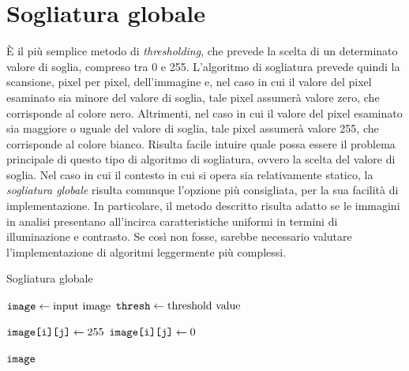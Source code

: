 \section{Sogliatura globale}
\label{sec:image-bin-global}
\`E il pi\`u semplice metodo di \textit{thresholding}, che prevede la scelta di un determinato valore di soglia, compreso tra 0 e 255. L'algoritmo di sogliatura prevede quindi la scansione, pixel per pixel, dell'immagine e, nel caso in cui il valore del pixel esaminato sia minore del valore di soglia, tale pixel assumer\`a valore zero, che corrisponde al colore nero. Altrimenti, nel caso in cui il valore del pixel esaminato sia maggiore o uguale del valore di soglia, tale pixel assumer\`a valore 255, che corrisponde al colore bianco. Risulta facile intuire quale possa essere il problema principale di questo tipo di algoritmo di sogliatura, ovvero la scelta del valore di soglia.
Nel caso in cui il contesto in cui si opera sia relativamente statico, la \textit{sogliatura globale} risulta comunque l'opzione pi\`u consigliata, per la sua facilit\`a di implementazione. In particolare, il metodo descritto risulta adatto se le immagini in analisi presentano all'incirca caratteristiche uniformi in termini di illuminazione e contrasto. Se cos\`i non fosse, sarebbe necessario valutare l'implementazione di algoritmi leggermente pi\`u complessi.
\begin{algorithm}
	\caption{Sogliatura globale}
	\label{alg:thresh-global}
	\begin{algorithmic}[1]
			\State $\texttt{image} \gets \text{input image}$
			\State $\texttt{thresh} \gets \text{threshold value}$
			
						\State $\texttt{image[i][j]} \gets 255$
					\Else
						\State $\texttt{image[i][j]} \gets 0$
					\EndIf
				\EndFor
			\EndFor

			\Return $\texttt{image}$
		\EndFunction
	\end{algorithmic}
\end{algorithm}


